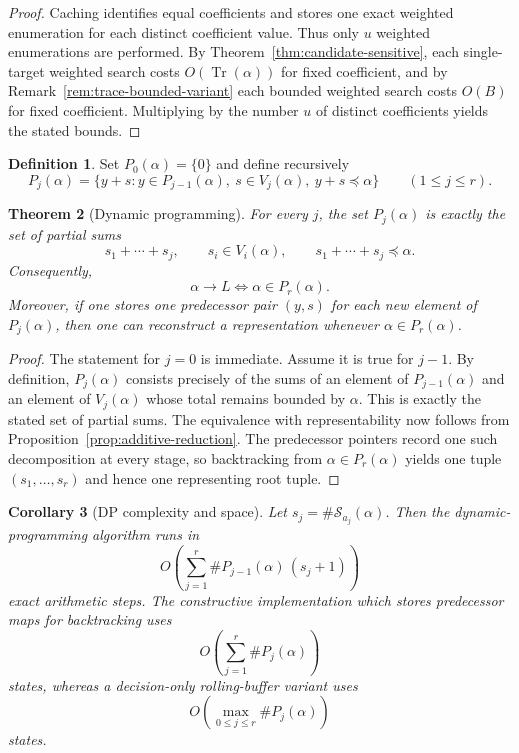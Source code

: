 \documentclass[manuscript]{acmart}
\theoremstyle{plain}
\newtheorem{theorem}{Theorem}[section]
\newtheorem{corollary}[theorem]{Corollary}
\theoremstyle{definition}
\newtheorem{definition}[theorem]{Definition}
\theoremstyle{nonitalicremark}
\newcommand{\Tr}{\operatorname{Tr}}
\newcommand{\cS}{\mathcal{S}}
\begin{document}
\begin{proof}
Caching identifies equal coefficients and stores one exact weighted enumeration for each distinct
coefficient value. Thus only $u$ weighted enumerations are performed. By
Theorem~\ref{thm:candidate-sensitive}, each single-target weighted search costs
$O(\Tr(\alpha))$ for fixed coefficient, and by Remark~\ref{rem:trace-bounded-variant} each bounded
weighted search costs $O(B)$ for fixed coefficient. Multiplying by the number $u$ of distinct
coefficients yields the stated bounds.
\end{proof}

\begin{definition}
Set $P_0(\alpha)=\{0\}$ and define recursively
\[
P_j(\alpha)=\{y+s : y\in P_{j-1}(\alpha),\ s\in V_j(\alpha),\ y+s\preccurlyeq \alpha\}
\qquad (1\le j\le r).
\]
\end{definition}

\begin{theorem}[Dynamic programming]\label{thm:dp}
For every $j$, the set $P_j(\alpha)$ is exactly the set of partial sums
\[
s_1+\cdots+s_j,
\qquad s_i\in V_i(\alpha),
\qquad s_1+\cdots+s_j\preccurlyeq \alpha.
\]
Consequently,
\[
\alpha\to L \iff \alpha\in P_r(\alpha).
\]
Moreover, if one stores one predecessor pair $(y,s)$ for each new element of $P_j(\alpha)$, then one
can reconstruct a representation whenever $\alpha\in P_r(\alpha)$.
\end{theorem}

\begin{proof}
The statement for $j=0$ is immediate. Assume it is true for $j-1$. By definition,
$P_j(\alpha)$ consists precisely of the sums of an element of $P_{j-1}(\alpha)$ and an element of
$V_j(\alpha)$ whose total remains bounded by $\alpha$. This is exactly the stated set of partial
sums. The equivalence with representability now follows from Proposition~\ref{prop:additive-reduction}.
The predecessor pointers record one such decomposition at every stage, so backtracking from
$\alpha\in P_r(\alpha)$ yields one tuple $(s_1,\dots,s_r)$ and hence one representing root tuple.
\end{proof}

\begin{corollary}[DP complexity and space]\label{cor:dp-complexity}
Let $s_j=\#\cS_{a_j}(\alpha)$. Then the dynamic-programming algorithm runs in
\[
O\!\left(\sum_{j=1}^r \#P_{j-1}(\alpha)\,(s_j+1)\right)
\]
exact arithmetic steps. The constructive implementation which stores predecessor maps for
backtracking uses
\[
O\!\left(\sum_{j=1}^r \#P_j(\alpha)\right)
\]
states, whereas a decision-only rolling-buffer variant uses
\[
O\!\left(\max_{0\le j\le r} \#P_j(\alpha)\right)
\]
states.
\end{corollary}
\end{document}
